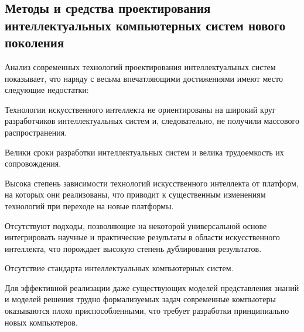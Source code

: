 
\begin{partbacktext}
\part{Методы и средства проектирования интеллектуальных компьютерных систем нового поколения}
\noindent 
Анализ современных технологий проектирования интеллектуальных систем показывает, что
наряду с весьма впечатляющими достижениями имеют место следующие недостатки:
\begin{textitemize}
	\item{Технологии искусственного интеллекта не ориентированы на широкий круг разработчиков
	интеллектуальных систем и, следовательно, не получили массового распространения.}
	\item{Велики сроки разработки интеллектуальных систем и велика трудоемкость их
		сопровождения.}
	\item{Высока степень зависимости технологий искусственного интеллекта от платформ, на которых
		они реализованы, что приводит к существенным изменениям технологий при переходе на
		новые платформы.}
	\item{Отсутствуют подходы, позволяющие на некоторой универсальной основе интегрировать
		научные и практические результаты в области искусственного интеллекта, что порождает
		высокую степень дублирования результатов.}
	\item{Отсутствие стандарта интеллектуальных компьютерных систем.}
	\item{Для эффективной реализации даже существующих моделей представления знаний и моделей
		решения трудно формализуемых задач современные компьютеры оказываются плохо
		приспособленными, что требует разработки принципиально новых компьютеров.}
\end{textitemize}


\end{partbacktext}
